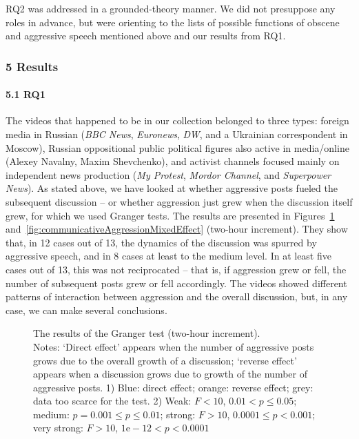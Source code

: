 RQ2 was addressed in a grounded-theory manner. We did not presuppose any roles in advance, but were orienting to the lists of possible functions of obscene and aggressive speech mentioned above and our results from RQ1.

\subsubsection{5 Results}

\paragraph{5.1 RQ1}

The videos that happened to be in our collection belonged to three types: foreign media in Russian (\textit{BBC News}, \textit{Euronews}, \textit{DW}, and a Ukrainian correspondent in Moscow), Russian oppositional public political figures also active in media/online (Alexey Navalny, Maxim Shevchenko), and activist channels focused mainly on independent news production (\textit{My Protest}, \textit{Mordor Channel}, and \textit{Superpower News}). As stated above, we have looked at whether aggressive posts fueled the subsequent discussion -- or whether aggression just grew when the discussion itself grew, for which we used Granger tests. The results are presented in Figures~\cref{fig:grangerTestResults} and~\cref{fig:communicativeAggressionMixedEffect} (two-hour increment). They show that, in 12 cases out of 13, the dynamics of the discussion was spurred by aggressive speech, and in 8 cases at least to the medium level. In at least five cases out of 13, this was not reciprocated -- that is, if aggression grew or fell, the number of subsequent posts grew or fell accordingly. The videos showed different patterns of interaction between aggression and the overall discussion, but, in any case, we can make several conclusions.

\begin{figure}[ht]
	\caption{The results of the Granger test (two-hour increment).\\Notes: ‘Direct effect’ appears when the number of aggressive posts grows due to the overall growth of a discussion; ‘reverse effect’ appears when a discussion grows due to growth of the number of aggressive posts. 1) Blue: direct effect; orange: reverse effect; grey: data too scarce for the test. 2) Weak: \(F < 10\), \(0.01 < p \le 0.05\); medium: \(p = 0.001 \le p \le 0.01\); strong: \(F > 10\), \(0.0001 \le p < 0.001\); very strong: \(F > 10\), \(1\text{e}-12 < p < 0.0001\)}\label{fig:grangerTestResults}
\end{figure}

